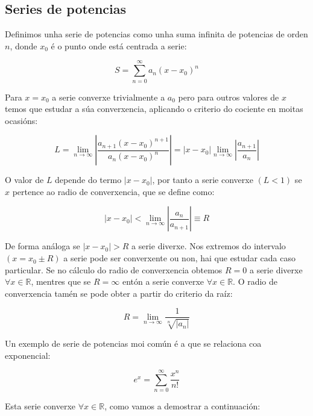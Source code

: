 \documentclass[a4paper,12pt,titlepage]{article}
\begin{document}
\subsection{Series de potencias}

Definimos unha serie de potencias como unha suma infinita de potencias de orden $n$, donde $x_0$ é o punto onde está centrada a serie:

\begin{equation*}
    S = \sum_{n=0}^\infty a_n(x-x_0)^n
\end{equation*}

Para $x=x_0$ a serie converxe trivialmente a $a_0$ pero para outros valores de $x$ temos que estudar a súa converxencia, aplicando o criterio do cociente en moitas ocasións:

\begin{equation*}
    L=\lim _{n \rightarrow \infty}\left|\frac{a_{n+1}\left(x-x_0\right)^{n+1}}{a_n\left(x-x_0\right)^n}\right|=\left|x-x_0\right| \lim _{n \rightarrow \infty}\left|\frac{a_{n+1}}{a_n}\right|
\end{equation*}

O valor de $L$ depende do termo $|x-x_0|$, por tanto a serie converxe $(L<1)$ se $x$ pertence ao radio de converxencia, que se define como:

\begin{equation*}
    |x-x_{0}|< \operatorname*{lim}_{n\to\infty}\left|\frac{a_{n}}{a_{n+1}}\right|\equiv R
\end{equation*}

De forma análoga se $|x-x_0|>R$ a serie diverxe. Nos extremos do intervalo $(x=x_0 \pm R)$ a serie pode ser converxente ou non, hai que estudar cada caso particular. Se no cálculo do radio de converxencia obtemos $R=0$ a serie diverxe $\forall x \in \mathbb{R}$, mentres que se $R=\infty$ entón a serie converxe $\forall x \in \mathbb{R}$. O radio de converxencia tamén se pode obter a partir do criterio da raíz:

\begin{equation*}
    R = \lim_{n\to \infty} \frac{1}{\sqrt[n]{|a_n|}}
\end{equation*}

Un exemplo de serie de potencias moi común é a que se relaciona coa exponencial:

\begin{equation*}
    e^x= \sum_{n=0}^{\infty} \frac{x^n}{n!}
\end{equation*}

Esta serie converxe $\forall x \in \mathbb{R}$, como vamos a demostrar a continuación:
\end{document}
